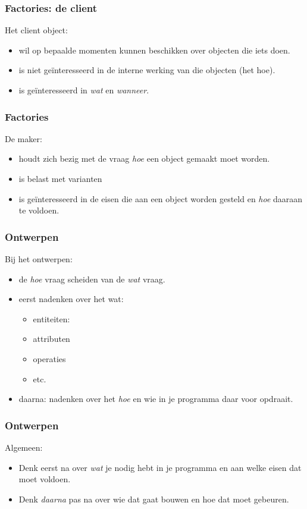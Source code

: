 \documentclass{beamer}
\begin{document}
\begin{frame}
\frametitle{Factories: de client}
Het client object:
\begin{itemize}
\item wil op bepaalde momenten kunnen beschikken over objecten die iets doen.
\item is niet ge\"interesseerd in de interne werking van die objecten (het hoe).
\item is ge\"interesseerd in \emph{wat} en \emph{wanneer}.
\end{itemize}
\end{frame}

\begin{frame}
\frametitle{Factories}
De maker:
\begin{itemize}
\item houdt zich bezig met de vraag \emph{hoe} een object gemaakt moet worden.
\item is belast met varianten
\item is ge\"interesseerd in de eisen die aan een object worden gesteld en \emph{hoe} daaraan te voldoen.
\end{itemize}
\end{frame}

\begin{frame}
\frametitle{Ontwerpen}
Bij het ontwerpen:
\begin{itemize}
\item de \emph{hoe} vraag scheiden van de \emph{wat} vraag.
\item eerst nadenken over het wat:
  \begin{itemize}
  \item entiteiten:
  \item attributen
  \item operaties
  \item etc.
  \end{itemize}
\item daarna: nadenken over het \emph{hoe} en wie in je programma daar voor opdraait.
\end{itemize}
\end{frame}

\begin{frame}
\frametitle{Ontwerpen}
Algemeen:
\begin{itemize}
\item Denk eerst na over \emph{wat} je nodig hebt in je programma en aan welke eisen dat moet voldoen.
\item Denk \emph{daarna} pas na over wie dat gaat bouwen en hoe dat moet gebeuren.
\end{itemize}
\end{frame}
\end{document}
